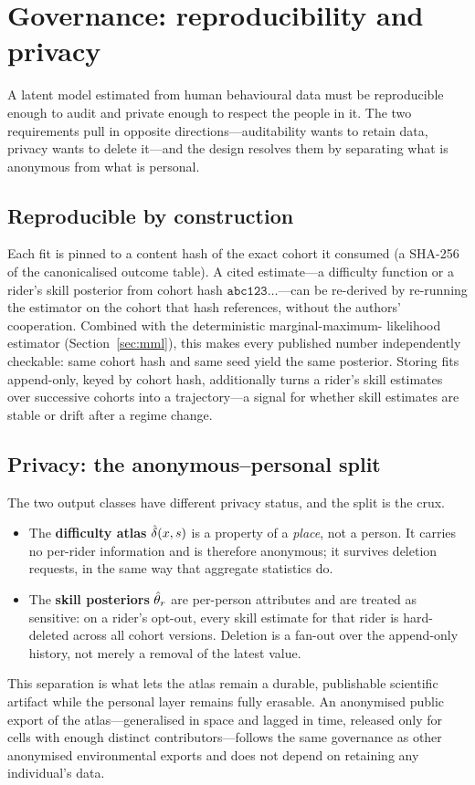\section{Governance: reproducibility and privacy}
\label{sec:governance}

A latent model estimated from human behavioural data must be reproducible enough
to audit and private enough to respect the people in it. The two requirements
pull in opposite directions---auditability wants to retain data, privacy wants to
delete it---and the design resolves them by separating what is anonymous from what
is personal.

\subsection{Reproducible by construction}

Each fit is pinned to a content hash of the exact cohort it consumed (a SHA-256 of
the canonicalised outcome table). A cited estimate---a difficulty function or a
rider's skill posterior from cohort hash $\mathtt{abc123\ldots}$---can be
re-derived by re-running the estimator on the cohort that hash references, without
the authors' cooperation. Combined with the deterministic marginal-maximum-
likelihood estimator (Section~\ref{sec:mml}), this makes every published number
independently checkable: same cohort hash and same seed yield the same posterior.
Storing fits append-only, keyed by cohort hash, additionally turns a rider's skill
estimates over successive cohorts into a trajectory---a signal for whether skill
estimates are stable or drift after a regime change.

\subsection{Privacy: the anonymous--personal split}

The two output classes have different privacy status, and the split is the crux.
\begin{itemize}
  \item The \textbf{difficulty atlas} $\hat{\delta}(x,s)$ is a property of
    a \emph{place}, not a person. It carries no per-rider information and is
    therefore anonymous; it survives deletion requests, in the same way that
    aggregate statistics do.
  \item The \textbf{skill posteriors} $\hat{\theta}_r$ are per-person
    attributes and are treated as sensitive: on a rider's opt-out, every skill
    estimate for that rider is hard-deleted across all cohort versions. Deletion
    is a fan-out over the append-only history, not merely a removal of the latest
    value.
\end{itemize}
This separation is what lets the atlas remain a durable, publishable scientific
artifact while the personal layer remains fully erasable. An anonymised public
export of the atlas---generalised in space and lagged in time, released only for
cells with enough distinct contributors---follows the same governance as other
anonymised environmental exports and does not depend on retaining any individual's
data.

